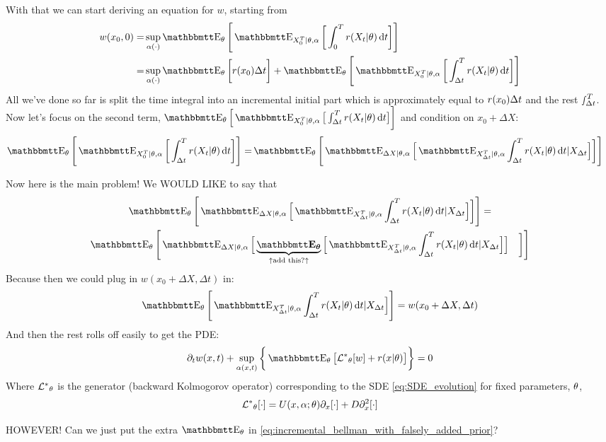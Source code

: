 \documentclass{article}
\begin{document}
With that we can start deriving an equation for $w$, starting from
\begin{align*}
w(x_0, 0) =& \sup_{\a(\cdot)} 
\Exp_\th \Bigg[ \Exp_{X_0^T|\th, \a} \bigg[ \int_0^T r(X_t| \th) \intd{t}
\bigg] \Bigg]
\\
=&  \sup_{\a(\cdot)} 
\Exp_\th \bigg[ r(x_0) \Delta t \bigg] + 
\Exp_\th \Bigg[ \Exp_{X_0^T|\th, \a} \bigg[ \int_{\Delta t}^T r(X_t| \th)
\intd{t} \bigg] \Bigg]
\end{align*}
All we've done so far is split the time integral into an incremental initial
part which is approximately equal to $r(x_0){ \Delta t }$ and the rest $\smallint_{ \Delta t }^T$.
Now let's focus on the second term, $\Exp_\th \Big[ \Exp_{X_0^T|\th, \a} \big[ \int_{\Delta t}^T r(X_t| \th)
\intd{t} \big] \bigg]$ and condition on $x_0 + \Delta X$:
\begin{align*}
\Exp_\th \Bigg[ \Exp_{X_0^T|\th, \a} \bigg[ \int_{\Delta t}^T r(X_t| \th)
\intd{t} \bigg] \Bigg]
=&  
\Exp_\th \Bigg[ \Exp_{\Delta X |\th, \a} \Big[ \Exp_{X_{\dt}^T|\th, \a}
\int_\dt^T r(X_t| \th) \intd{t} | X_\dt \Big] \bigg] \Bigg]
\end{align*}

Now here is the main problem! We WOULD LIKE to say that
\begin{multline}
\Exp_\th \Bigg[ \Exp_{\Delta X |\th, \a} \Big[ \Exp_{X_{\dt}^T|\th, \a}
\int_\dt^T r(X_t| \th) \intd{t} | X_\dt \Big] \bigg] \Bigg] 
= \\
\Exp_\th \Bigg[ \Exp_{\Delta X |\th, \a} \Big[ 
\underbrace{\boldsymbol{\Exp_\th}}_{\uparrow\textrm{add this?} \uparrow} \Big[
\Exp_{X_{\dt}^T|\th, \a} \int_\dt^T r(X_t| \th) \intd{t} | X_\dt \Big]\Big]
\quad \bigg] \Bigg]
\label{eq:incremental_bellman_with_falsely_added_prior}
\end{multline}
Because then we could plug in $w(x_0 + \Delta X, \Delta t)$ in:
$$
\Exp_\th \Bigg[
\Exp_{X_{\dt}^T|\th, \a} \int_\dt^T r(X_t| \th) \intd{t} | X_\dt \Big]\Bigg] =
 w(x_0
+ \Delta X, \Delta t) $$
And then the rest rolls off easily to get the PDE:
\begin{equation}
\di_t w(x,t) + \sup_{\a(x,t)} \bigg\{  \Exp_\th \big[\Lstar_\th [w] +
r(x|\th)\big] \bigg\} = 0
\label{eq:HJB_equation_with_prior}
\end{equation}
Where ${ { \mathcal{L} }^* }_{\theta}$ is the generator (backward Kolmogorov operator) corresponding
to the SDE \cref{eq:SDE_evolution} for fixed parameters, ${\theta}$,
$$
{ { \mathcal{L} }^* }_{\theta}[\cdot] = U(x,{\alpha}; {\theta}) {\partial}_x[\cdot] + D {\partial}_x^2[\cdot]
$$

HOWEVER! Can we just put the extra
$\Exp_\th$ in \cref{eq:incremental_bellman_with_falsely_added_prior}? 
\end{document}

